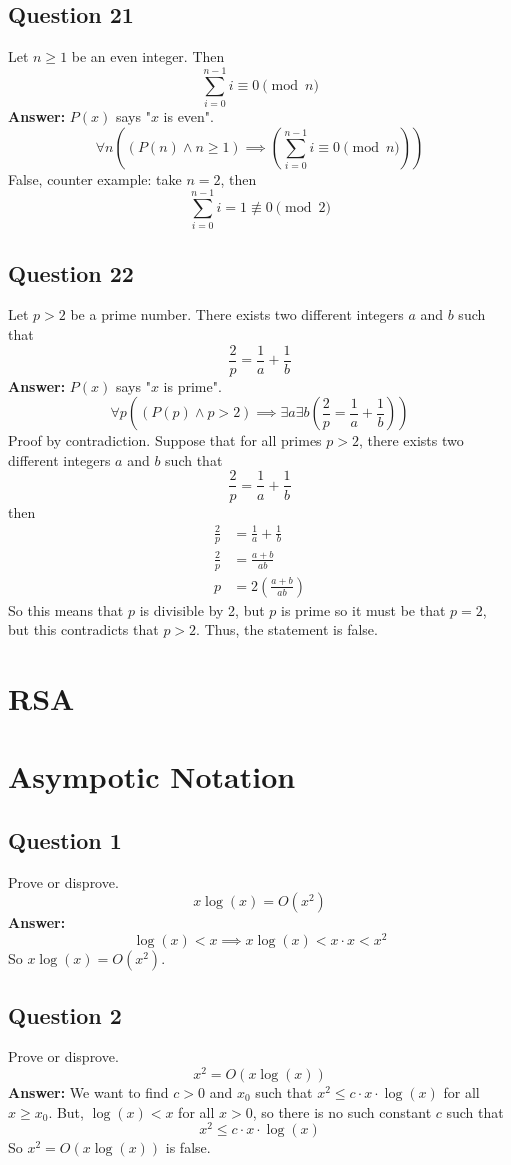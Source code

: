 \documentclass[openany]{report}
\begin{document}
\section{Question 21}
Let $n\geq 1$ be an even integer. Then 
\[\sum_{i=0}^{n-1}i \equiv 0 \pmod{n}\]
\textbf{Answer:} $P(x)$ says "$x$ is even".
\[\forall n ((P(n) \wedge n \geq 1) \implies \left(\sum_{i=0}^{n-1} i \equiv 0 \pmod{n}\right))\]
False, counter example: take $n=2$, then 
\[\sum_{i=0}^{n-1} i = 1 \not\equiv 0 \pmod{2}\]
\section{Question 22}
Let $p >2$ be a prime number. There exists two different integers $a$ and $b$ such that 
\[\frac{2}{p} = \frac{1}{a} + \frac{1}{b}\]
\textbf{Answer:} $P(x)$ says "$x$ is prime".
\[\forall p((P(p) \wedge p > 2) \implies \exists a \exists b\left(\frac{2}{p} = \frac{1}{a} + \frac{1}{b}\right))\]
Proof by contradiction. Suppose that for all primes $p > 2$, there exists two different integers $a$ and $b$ such that
\[\frac{2}{p} = \frac{1}{a} + \frac{1}{b}\]
then 
\begin{align*}
    \frac{2}{p} &= \frac{1}{a} + \frac{1}{b}\\
    \frac{2}{p} &= \frac{a + b}{ab}\\
    p &= 2\left(\frac{a+b}{ab}\right)
\end{align*}
So this means that $p$ is divisible by 2, but $p$ is prime so it must be that $p =2$, but this contradicts that $p >2$. Thus, the statement is false.

\chapter{RSA}

\chapter{Asympotic Notation}
\section{Question 1}
Prove or disprove.
\[x\log(x) = O(x^2)\]
\textbf{Answer:}
\[\log(x) < x \implies x\log(x) < x\cdot x < x^2\]
So $x\log(x) = O(x^2)$.
\section{Question 2}
Prove or disprove. 
\[x^2 = O(x\log(x))\]
\textbf{Answer:} We want to find $c > 0$ and $x_0$ such that $x^2 \leq c \cdot x \cdot \log(x)$ for all $x \geq x_0$. But, $\log(x) < x$ for all $x > 0$, so there is no such constant $c$ such that 
\[x^2 \leq c \cdot x \cdot \log(x)\]
So $x^2 = O(x\log(x))$ is false.
\end{document}
